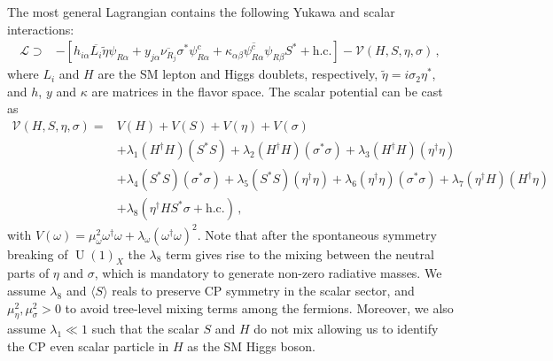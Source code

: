 \documentclass[12pt]{article}
\begin{document}
The most general Lagrangian contains the following Yukawa and scalar interactions:
%
\begin{align*}
\label{eq:LagY}
    \mathcal{L} \supset& -[ 
    h_{i\alpha} \overline{L_{i}} \tilde{\eta} \psi_{R\alpha} +  y_{j\alpha} \overline{\nu_{R_{j}}} \sigma^* \psi^c_{R\alpha} + \kappa_{\alpha\beta} \overline{\psi^{c}_{R\alpha}} \psi_{R\beta} S^* + \text{h.c.}] - \mathcal{V}(H, S, \eta, \sigma)\,,
\end{align*}
%
where $L_{i}$ and $H$ are the SM lepton and Higgs doublets, respectively,  $\widetilde{\eta} = i \sigma_2 \eta^*$, and $h$, $y$ and $\kappa$ are matrices in the flavor space. 
The scalar potential can be cast as
%
\begin{align*}
    \mathcal{V}(H, S, \eta, \sigma) = & V(H) + V(S) + V(\eta) + V(\sigma) \\
    &+  \lambda_{1} (H^{\dagger} H ) (S^{*} S) + \lambda_{2} (H^{\dagger} H ) (\sigma^{*} \sigma ) + \lambda_{3} (H^{\dagger} H ) (\eta^{\dagger} \eta )\\
    &+ \lambda_{4} (S^{*} S) (\sigma^{*} \sigma ) + \lambda_{5} (S^{*} S) (\eta^{\dagger} \eta ) + \lambda_{6} (\eta^{\dagger} \eta ) (\sigma^{*} \sigma ) + \lambda_{7} (\eta^{\dagger} H ) (H^{\dagger} \eta ) \\
    &+ \lambda_{8} (\eta^{\dagger} H S^{*} \sigma + \text{h.c.})\,,
\end{align*}
%
%
%
with $V(\omega) = \mu^{2}_{\omega} \omega^{\dagger} \omega + \lambda_{\omega} (\omega^{\dagger} \omega)^{2}$. 
Note that after the spontaneous symmetry breaking of $\operatorname{U}(1)_X$ the $\lambda_8$ term gives rise to the mixing between the neutral parts of $\eta$ and $\sigma$, which is mandatory to generate non-zero radiative masses. 
We assume $\lambda_8$ and $\langle S\rangle$ reals to preserve CP symmetry in the scalar sector, and $\mu^2_\eta,\mu^2_\sigma>0$ to avoid tree-level mixing terms among the fermions. 
Moreover, we also assume $\lambda_1\ll1$  such that the scalar $S$ and $H$ do not mix allowing us to identify the CP even scalar particle in $H$ as the SM Higgs boson. 
\end{document}
